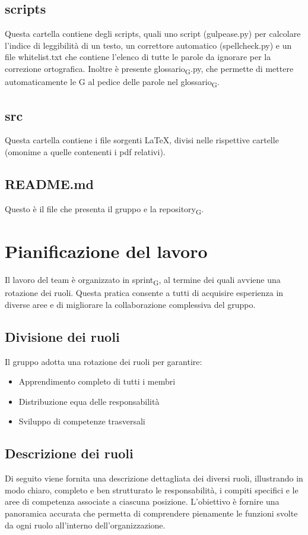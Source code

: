 \documentclass[11pt,a4paper]{article}
\newcommand{\gls}[1]{#1\textsubscript{G}}
\begin{document}
\subsection{scripts}
Questa cartella contiene degli scripts, quali uno script (gulpease.py) per calcolare l'indice di leggibilità di un testo, un correttore automatico (spellcheck.py) e un file whitelist.txt che contiene l'elenco di tutte le parole da ignorare per la correzione ortografica. Inoltre è presente \gls{glossario}.py, che permette di mettere automaticamente le G al pedice delle parole nel \gls{glossario}.
\subsection{src}
Questa cartella contiene i file sorgenti LaTeX, divisi nelle rispettive cartelle (omonime a quelle contenenti i pdf relativi).

\subsection{README.md}
Questo è il file che presenta il gruppo e la \gls{repository}.

\newpage

\section{Pianificazione del lavoro}
Il lavoro del team è organizzato in \gls{sprint}, al termine dei quali avviene una rotazione dei ruoli. Questa pratica consente a tutti di acquisire esperienza in diverse aree e di migliorare la collaborazione complessiva del gruppo.

\subsection{Divisione dei ruoli}
Il gruppo adotta una rotazione dei ruoli per garantire:
\begin{itemize}
    \item Apprendimento completo di tutti i membri
    \item Distribuzione equa delle responsabilità
    \item Sviluppo di competenze trasversali
\end{itemize}

\subsection{Descrizione dei ruoli}
Di seguito viene fornita una descrizione dettagliata dei diversi ruoli, illustrando in modo chiaro, completo e ben strutturato le responsabilità, i compiti specifici e le aree di competenza associate a ciascuna posizione. L’obiettivo è fornire una panoramica accurata che permetta di comprendere pienamente le funzioni svolte da ogni ruolo all’interno dell’organizzazione.
\end{document}
